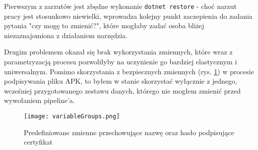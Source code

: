 Pierwszym z zarzutów jest zbędne wykonanie \verb|dotnet restore| - choć narzut pracy 
jest stosunkowo niewielki, wprowadza kolejny punkt zaczepienia do zadania pytania "czy mogę to zmienić?", 
które mogłaby zadać osoba bliżej niezaznajomiona z działaniem narzędzia.

Drugim problemem okazał się brak wykorzystania zmiennych, które wraz z parametryzacją procesu 
pozwoliłyby na uczynienie go bardziej elastycznym i uniwersalnym. Pomimo skorzystania z bezpiecznych 
zmiennych (rys. \ref{img:variableGroups}) w procesie podpisywania pliku APK, 
to byłem w stanie skorzystać wyłącznie z jednego, wcześniej przygotowanego zestawu danych, 
którego nie mogłem zmienić przed wywołaniem pipeline'a.

\begin{figure}[ht]
    \centering
    \texttt{[image: variableGroups.png]}
    \caption{Predefiniowane zmienne przechowujące nazwę oraz hasło podpisujące certyfikat}
    \label{img:variableGroups}
\end{figure}

\newpage